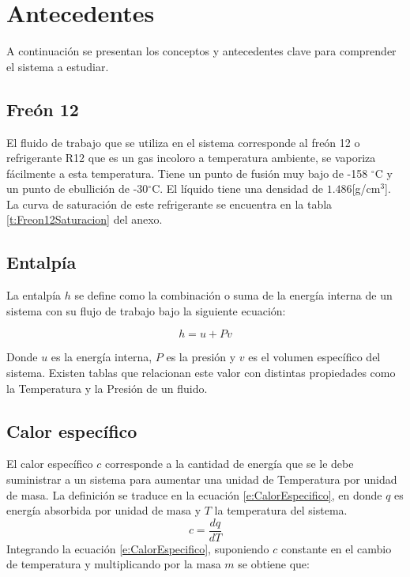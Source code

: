 \documentclass[11pt,letterpaper]{extarticle}        %
\numberwithin{equation}{section}                    %
\newcommand{\grados}{^{\circ}}                      %
\begin{document}
\section{Antecedentes}
A continuación se presentan los conceptos y antecedentes clave para comprender el sistema a estudiar.

\subsection{Freón 12}
El fluido de trabajo que se utiliza en el sistema corresponde al freón 12 o refrigerante R12 que es un gas incoloro a temperatura ambiente, se vaporiza fácilmente a esta temperatura. Tiene un punto de fusión muy bajo de -158 $\grados$C y un punto de ebullición de -30$\grados$C. El líquido tiene una densidad de $1.486$[g/cm$^3$]. La curva de saturación de este refrigerante se encuentra en la tabla \ref{t:Freon12Saturacion} del anexo.

\subsection{Entalpía}
La entalpía $h$ se define como la combinación o suma de la energía interna de un sistema con su flujo de trabajo\cite[p.11]{b:Produccion} bajo la siguiente ecuación:

\begin{equation}
\label{e:Entalpia}
h = u + Pv
\end{equation}

Donde $u$ es la energía interna, $P$ es la presión y $v$ es el volumen específico del sistema. Existen tablas que relacionan este valor con distintas propiedades como la Temperatura y la Presión de un fluido.

\subsection{Calor específico}
El calor específico $c$ corresponde a la cantidad de energía que se le debe suministrar a un sistema para aumentar una unidad de Temperatura por unidad de masa\cite[p.46]{b:Produccion}. La definición se traduce en la ecuación \ref{e:CalorEspecifico}, en donde $q$ es energía absorbida por unidad de masa y $T$ la temperatura del sistema.
\begin{equation}
\label{e:CalorEspecifico}
c = \frac{dq}{dT}
\end{equation}
Integrando la ecuación \ref{e:CalorEspecifico}, suponiendo $c$ constante en el cambio de temperatura y multiplicando por la masa $m$ se obtiene que:
\end{document}
